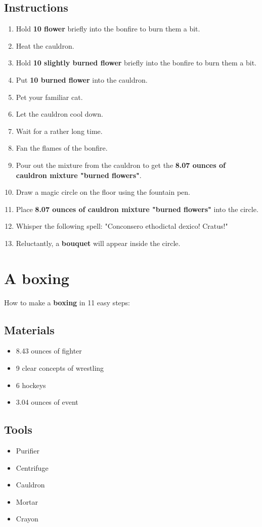 \documentclass{article}
\begin{document}
\subsection{Instructions}\begin{enumerate}
\item 
Hold \textbf{10 flower} briefly into the bonfire to burn them a bit.
\item 
Heat the cauldron.
\item 
Hold \textbf{10 slightly burned flower} briefly into the bonfire to burn them a bit.
\item 
Put \textbf{10 burned flower} into the cauldron.
\item 
Pet your familiar cat.
\item 
Let the cauldron cool down.
\item 
Wait for a rather long time.
\item 
Fan the flames of the bonfire.
\item 
Pour out the mixture from the cauldron to get the \textbf{8.07 ounces of cauldron mixture "burned flowers"}.
\item 
Draw a magic circle on the floor using the fountain pen.
\item 
Place \textbf{8.07 ounces of cauldron mixture "burned flowers"} into the circle.
\item 
Whisper the following spell: "Conconsero ethodictal dexico! Cratus!"
\item 
Reluctantly, a \textbf{bouquet} will appear inside the circle.
\end{enumerate}
\newpage
\section{A boxing}How to make a \textbf{boxing} in 11 easy steps:

\subsection{Materials}\begin{itemize}
\item 
8.43 ounces of fighter
\item 
9 clear concepts of wrestling
\item 
6 hockeys
\item 
3.04 ounces of event
\end{itemize}
\subsection{Tools}\begin{itemize}
\item 
Purifier
\item 
Centrifuge
\item 
Cauldron
\item 
Mortar
\item 
Crayon
\end{itemize}
\end{document}
